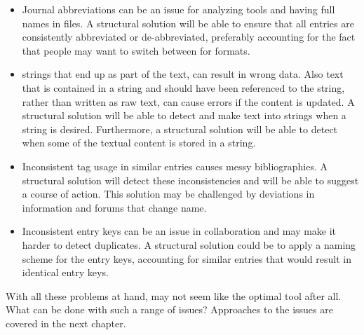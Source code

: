 \begin{itemize}
\item Journal abbreviations can be an issue for analyzing tools and
  having full names in {\bibtex} files.  A structural solution will be
  able to ensure that all entries are consistently abbreviated or
  de-abbreviated, preferably accounting for the fact that people may
  want to switch between for formats.

\item {\bibtex} strings that end up as part of the text, can result in
  wrong data.  Also text that is contained in a string and should have
  been referenced to the string, rather than written as raw text, can
  cause errors if the content is updated.  A structural solution will
  be able to detect and make text into strings when a string is
  desired.  Furthermore, a structural solution will be able to detect
  when some of the textual content is stored in a string.

\item Inconsistent tag usage in similar entries causes messy
  bibliographies. A structural solution will detect these
  inconsistencies and will be able to suggest a course of action.
  This solution may be challenged by deviations in information and
  forums that change name.

\item Inconsistent entry keys can be an issue in collaboration and may
  make it harder to detect duplicates.  A structural solution could be
  to apply a naming scheme for the entry keys, accounting for similar
  entries that would result in identical entry keys.
\end{itemize}

With all these problems at hand, {\bibtex} may not seem like the
optimal tool after all.  What can be done with such a range of
issues?  Approaches to the issues are covered in the next chapter.